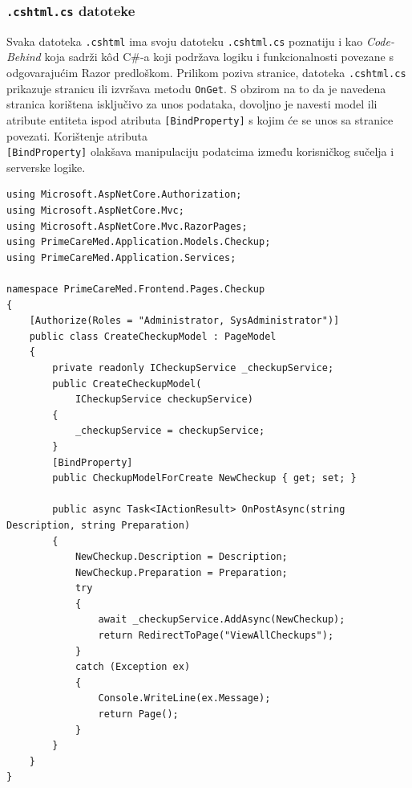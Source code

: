 \subsubsection{\texttt{.cshtml.cs} datoteke}
\label{subsubsec:.cshtml.cs}
Svaka datoteka \texttt{.cshtml} ima svoju datoteku \texttt{.cshtml.cs} poznatiju i kao \textit{Code-Behind} koja sadrži k\^od C\#-a koji podržava logiku i funkcionalnosti povezane s odgovarajućim Razor predloškom. Prilikom poziva stranice, datoteka \texttt{.cshtml.cs} prikazuje stranicu ili izvršava metodu \texttt{OnGet}. S obzirom na to da je navedena stranica korištena isključivo za unos podataka, dovoljno je navesti model ili atribute entiteta ispod atributa \texttt{[BindProperty]} s kojim će se unos sa stranice povezati. Korištenje atributa \\\texttt{[BindProperty]} olakšava manipulaciju podatcima između korisničkog sučelja i serverske logike.

\begin{lstlisting}[caption={Datoteka \texttt{CreateCheckup.cshtml.cs}}, label=createCheckupCs]
using Microsoft.AspNetCore.Authorization;
using Microsoft.AspNetCore.Mvc;
using Microsoft.AspNetCore.Mvc.RazorPages;
using PrimeCareMed.Application.Models.Checkup;
using PrimeCareMed.Application.Services;

namespace PrimeCareMed.Frontend.Pages.Checkup
{
    [Authorize(Roles = "Administrator, SysAdministrator")]
    public class CreateCheckupModel : PageModel
    {
        private readonly ICheckupService _checkupService;
        public CreateCheckupModel(
            ICheckupService checkupService)
        {
            _checkupService = checkupService;
        }
        [BindProperty]
        public CheckupModelForCreate NewCheckup { get; set; }

        public async Task<IActionResult> OnPostAsync(string Description, string Preparation)
        {
            NewCheckup.Description = Description;
            NewCheckup.Preparation = Preparation;
            try
            {
                await _checkupService.AddAsync(NewCheckup);
                return RedirectToPage("ViewAllCheckups");
            }
            catch (Exception ex)
            {
                Console.WriteLine(ex.Message);
                return Page();
            }   
        }
    }
}
\end{lstlisting}

